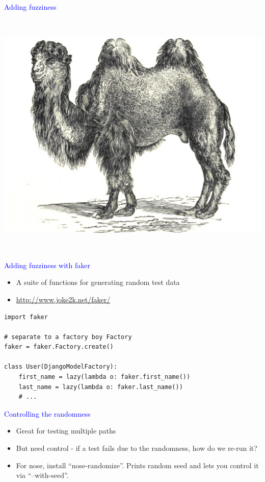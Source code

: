 \documentclass[landscape]{slides}
\begin{document}
\begin{slide}
    \textcolor{blue}{\Large{Adding fuzziness}}

    \begin{center}
        \includegraphics[height=12cm]{fuzzy}
    \end{center}
\end{slide}


\begin{slide}
    \textcolor{blue}{\Large{Adding fuzziness with faker}}

    \begin{itemize}
        \item A suite of functions for generating random test data
        \item \url{http://www.joke2k.net/faker/}
    \end{itemize}

    \begin{lstlisting}
import faker

# separate to a factory boy Factory
faker = faker.Factory.create()

class User(DjangoModelFactory):
    first_name = lazy(lambda o: faker.first_name())
    last_name = lazy(lambda o: faker.last_name())
    # ...
    \end{lstlisting}
\end{slide}


\begin{slide}
    \textcolor{blue}{\Large{Controlling the randomness}}

    \begin{itemize}
        \item Great for testing multiple paths
        \item But need control - if a test fails due to the randomness, how do we re-run it?
        \item For nose, install ``nose-randomize''. Prints random seed and lets you control it via ``--with-seed''.
    \end{itemize}
\end{slide}
\end{document}
